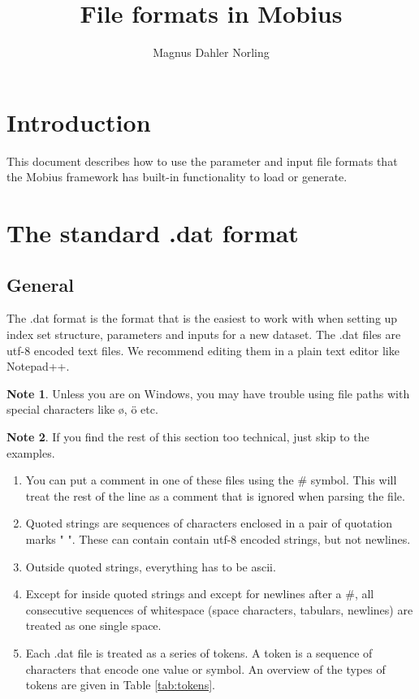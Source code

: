 \documentclass[11pt]{article}
\title{File formats in Mobius}
\author{Magnus Dahler Norling}
\theoremstyle{definition}
\newtheorem{mynote}{Note}
\newenvironment{note}%
  {\begin{lrbox}{\notebox}%
   \begin{minipage}{\dimexpr\linewidth-2\fboxsep}
   \begin{mynote}}%
  {\end{mynote}%
   \end{minipage}%
   \end{lrbox}%
   \begin{trivlist}
     \item[]\colorbox{silver}{\usebox\notebox}
   \end{trivlist}}
\begin{document}
\maketitle

\tableofcontents

\section{Introduction}

This document describes how to use the parameter and input file formats that the Mobius framework has built-in functionality to load or generate.

\section{The standard .dat format}

\subsection{General}
The .dat format is the format that is the easiest to work with when setting up index set structure, parameters and inputs for a new dataset. The .dat files are utf-8 encoded text files. We recommend editing them in a plain text editor like Notepad++.

\begin{note}
Unless you are on Windows, you may have trouble using file paths with special characters like \o, \"{o} etc.
\end{note}

\begin{note}
If you find the rest of this section too technical, just skip to the examples.
\end{note}

\begin{enumerate}[i]
\item You can put a comment in one of these files using the \# symbol. This will treat the rest of the line as a comment that is ignored when parsing the file.
\item Quoted strings are sequences of characters enclosed in a pair of quotation marks " ". These can contain contain utf-8 encoded strings, but not newlines.
\item Outside quoted strings, everything has to be ascii.
\item Except for inside quoted strings and except for newlines after a \#, all consecutive sequences of whitespace (space characters, tabulars, newlines) are treated as one single space.
\item Each .dat file is treated as a series of tokens. A token is a sequence of characters that encode one value or symbol. An overview of the types of tokens are given in Table \ref{tab:tokens}.
\end{enumerate}
\end{document}
